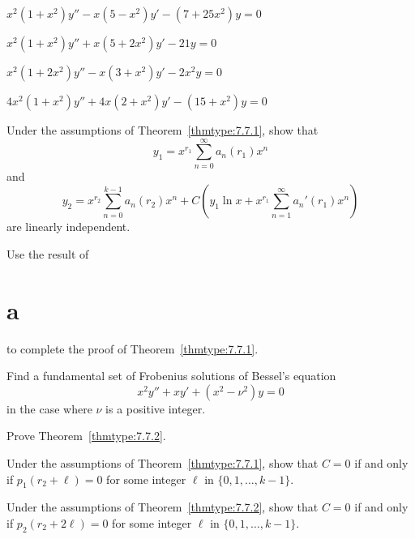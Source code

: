 \begin{exerciselist}
  \item\label{exer:7.7.37} $x^{2}(1+x^{2})y''-x(5-x^{2})y'-(7+25x^{2})y=0$

  \item\label{exer:7.7.38} $x^{2}(1+x^{2})y''+x(5+2x^{2})y'-21y=0$

  \item\label{exer:7.7.39} $x^{2}(1+2x^{2})y''-x(3+x^{2})y'-2x^{2}y=0$

  \item\label{exer:7.7.40} $4x^{2}(1+x^{2})y''+4x(2+x^{2})y'-(15+x^{2})y=0$

  \item\label{exer:7.7.41}
  \begin{alist}
    \item %
    Under the assumptions of Theorem~\ref{thmtype:7.7.1}, show that
    \[
      y_{1}=x^{r_{1}}\sum_{n=0}^{\infty}a_{n}(r_{1})x^{n}
    \]
    and
    \[
      y_{2}=x^{r_{2}}\sum_{n=0}^{k-1}a_{n}(r_{2})x^{n}+C\left(y_{1}\ln x+x^{r_{1}}\sum_{n=1}^{\infty}a_{n}'(r_{1})x^{n}\right)
    \]
    are linearly independent. 

    \item %
    Use the result of \part{a} to complete the proof of Theorem~\ref{thmtype:7.7.1}.
  \end{alist}

  \item\label{exer:7.7.42} Find a fundamental set of Frobenius solutions of Bessel's equation
  \[
    x^{2}y''+xy'+(x^{2}-\nu^{2})y=0
  \]
  in the case where $\nu$ is a positive integer.

  \item\label{exer:7.7.43} Prove Theorem~\ref{thmtype:7.7.2}.

  \item\label{exer:7.7.44} Under the assumptions of Theorem~\ref{thmtype:7.7.1}, show that $C=0$ if
        and only if $p_{1}(r_{2}+\ell)=0$ for some integer $\ell$ in $\{0,1,\dots,k-1\}$.

  \item\label{exer:7.7.45} Under the assumptions of Theorem~\ref{thmtype:7.7.2}, show that $C=0$ if
        and only if $p_{2}(r_{2}+2\ell)=0$ for some integer $\ell$ in $\{0,1,\dots,k-1\}$.


\end{exerciselist}
